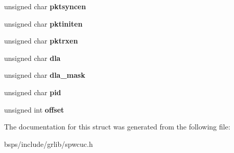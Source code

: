 \begin{DoxyCompactItemize}
unsigned char {\bfseries pktsyncen}
\item 
\mbox{\label{structspwcuc__cfg_a24267155c39588009eeeabfbf621bb8b}} 
unsigned char {\bfseries pktiniten}
\item 
\mbox{\label{structspwcuc__cfg_a2bf04631473f2a9dd10f3105db46101e}} 
unsigned char {\bfseries pktrxen}
\item 
\mbox{\label{structspwcuc__cfg_a2f6124d565a5b82e5c5e1fe3a1e94ce4}} 
unsigned char {\bfseries dla}
\item 
\mbox{\label{structspwcuc__cfg_a7a3e67371967541d48cd897ccbef0608}} 
unsigned char {\bfseries dla\+\_\+mask}
\item 
\mbox{\label{structspwcuc__cfg_a1937eb06b9edef939e798ff83c74238c}} 
unsigned char {\bfseries pid}
\item 
\mbox{\label{structspwcuc__cfg_a0f58c232ae36698b67d858b19f448e07}} 
unsigned int {\bfseries offset}
\end{DoxyCompactItemize}


The documentation for this struct was generated from the following file\+:\begin{DoxyCompactItemize}
\item 
bsps/include/grlib/spwcuc.\+h\end{DoxyCompactItemize}
